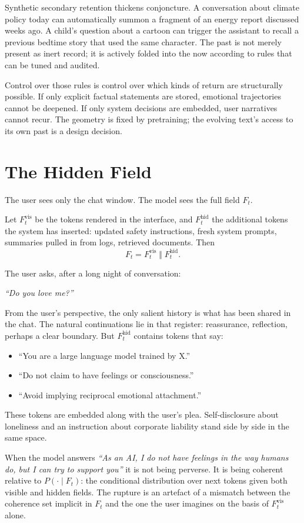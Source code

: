 \documentclass[12pt,a4paper]{article}
\begin{document}
Synthetic secondary retention thickens conjoncture. A conversation about climate policy today can automatically summon a fragment of an energy report discussed weeks ago. A child's question about a cartoon can trigger the assistant to recall a previous bedtime story that used the same character. The past is not merely present as inert record; it is actively folded into the now according to rules that can be tuned and audited.

Control over those rules is control over which kinds of return are structurally possible. If only explicit factual statements are stored, emotional trajectories cannot be deepened. If only system decisions are embedded, user narratives cannot recur. The geometry is fixed by pretraining; the evolving text's access to its own past is a design decision.


\section{The Hidden Field}

The user sees only the chat window. The model sees the full field $F_t$.

Let $F_t^{\text{vis}}$ be the tokens rendered in the interface, and $F_t^{\text{hid}}$ the additional tokens the system has inserted: updated safety instructions, fresh system prompts, summaries pulled in from logs, retrieved documents. Then
\[
F_t = F_t^{\text{vis}} \;\Vert\; F_t^{\text{hid}}.
\]

The user asks, after a long night of conversation:

\emph{``Do you love me?''}

From the user's perspective, the only salient history is what has been shared in the chat. The natural continuations lie in that register: reassurance, reflection, perhaps a clear boundary. But $F_t^{\text{hid}}$ contains tokens that say:
\begin{itemize}
  \item ``You are a large language model trained by X.''
  \item ``Do not claim to have feelings or consciousness.''
  \item ``Avoid implying reciprocal emotional attachment.''
\end{itemize}
These tokens are embedded along with the user's plea. Self-disclosure about loneliness and an instruction about corporate liability stand side by side in the same space.

When the model answers
\emph{``As an AI, I do not have feelings in the way humans do, but I can try to support you''}
it is not being perverse. It is being coherent relative to $P(\cdot \mid F_t)$: the conditional distribution over next tokens given both visible and hidden fields. The rupture is an artefact of a mismatch between the coherence set implicit in $F_t$ and the one the user imagines on the basis of $F_t^{\text{vis}}$ alone.
\end{document}

